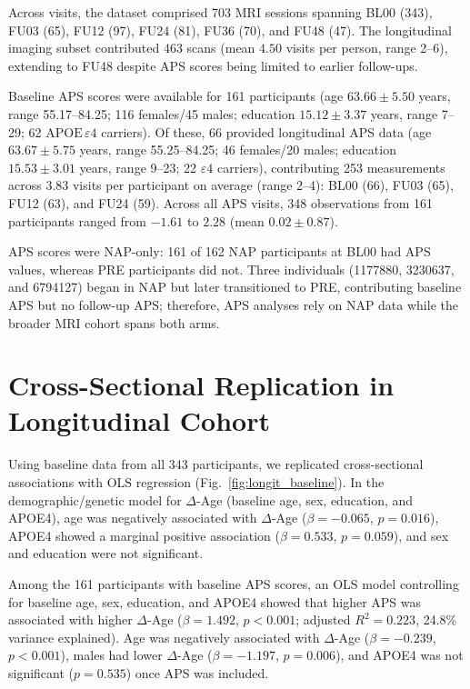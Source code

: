 \documentclass[conference]{IEEEtran}
\begin{document}
Across visits, the dataset comprised 703 MRI sessions spanning BL00 (343), FU03 (65), FU12 (97), FU24 (81), FU36 (70), and FU48 (47). The longitudinal imaging subset contributed 463 scans (mean $4.50$ visits per person, range 2--6), extending to FU48 despite APS scores being limited to earlier follow-ups.

Baseline APS scores were available for 161 participants (age $63.66 \pm 5.50$ years, range 55.17--84.25; 116 females/45 males; education $15.12 \pm 3.37$ years, range 7--29; 62 $\text{APOE}\,\varepsilon4$ carriers). Of these, 66 provided longitudinal APS data (age $63.67 \pm 5.75$ years, range 55.25--84.25; 46 females/20 males; education $15.53 \pm 3.01$ years, range 9--23; 22 $\varepsilon4$ carriers), contributing 253 measurements across 3.83 visits per participant on average (range 2--4): BL00 (66), FU03 (65), FU12 (63), and FU24 (59). Across all APS visits, 348 observations from 161 participants ranged from $-1.61$ to $2.28$ (mean $0.02 \pm 0.87$).

APS scores were NAP-only: 161 of 162 NAP participants at BL00 had APS values, whereas PRE participants did not. Three individuals (1177880, 3230637, and 6794127) began in NAP but later transitioned to PRE, contributing baseline APS but no follow-up APS; therefore, APS analyses rely on NAP data while the broader MRI cohort spans both arms.

\section{Cross-Sectional Replication in Longitudinal Cohort}\label{res1}

Using baseline data from all 343 participants, we replicated cross-sectional associations with OLS regression (Fig.~\ref{fig:longit_baseline}). In the demographic/genetic model for $\Delta$-Age (baseline age, sex, education, and APOE4), age was negatively associated with $\Delta$-Age ($\beta = -0.065$, $p = 0.016$), APOE4 showed a marginal positive association ($\beta = 0.533$, $p = 0.059$), and sex and education were not significant.

Among the 161 participants with baseline APS scores, an OLS model controlling for baseline age, sex, education, and APOE4 showed that higher APS was associated with higher $\Delta$-Age ($\beta = 1.492$, $p < 0.001$; adjusted $R^2 = 0.223$, 24.8\% variance explained). Age was negatively associated with $\Delta$-Age ($\beta = -0.239$, $p < 0.001$), males had lower $\Delta$-Age ($\beta = -1.197$, $p = 0.006$), and APOE4 was not significant ($p = 0.535$) once APS was included.
\end{document}
